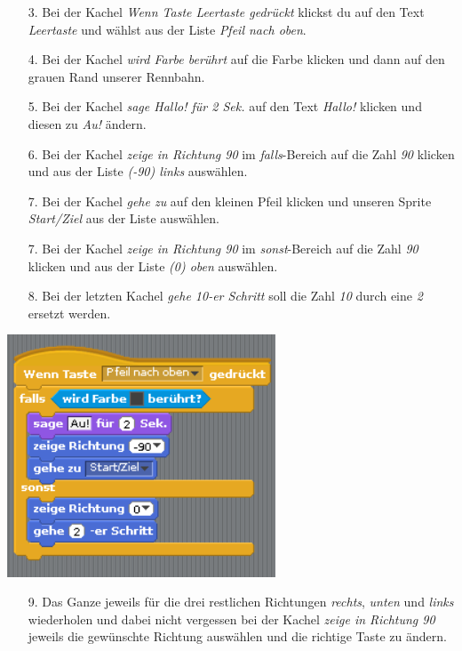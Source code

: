 \begin{itemize}
\item[3. ] Bei der Kachel \textit{Wenn Taste Leertaste gedrückt} klickst du auf den Text \textit{Leertaste} und w{\"a}hlst aus der Liste \textit{Pfeil nach oben}.
\item[4. ] Bei der Kachel \textit{wird Farbe berührt} auf die Farbe klicken und dann auf den grauen Rand unserer Rennbahn.
\item[5. ] Bei der Kachel \textit{sage Hallo! für 2 Sek.} auf den Text \textit{Hallo!} klicken und diesen zu \textit{Au!} ändern.
\item[6. ] Bei der Kachel \textit{zeige in Richtung 90} im \textit{falls}-Bereich auf die Zahl \textit{90} klicken und aus der Liste \textit{(-90) links} auswählen.
\item[7. ] Bei der Kachel \textit{gehe zu} auf den kleinen Pfeil klicken und unseren Sprite \textit{Start/Ziel} aus der Liste auswählen.
\item[7. ] Bei der Kachel \textit{zeige in Richtung 90} im \textit{sonst}-Bereich auf die Zahl \textit{90} klicken und aus der Liste \textit{(0) oben} auswählen.
\item[8. ] Bei der letzten Kachel \textit{gehe 10-er Schritt} soll die Zahl \textit{10} durch eine \textit{2} ersetzt werden.
\end{itemize}
\includegraphics[width=0.6\textwidth]{images/aufgabe4_bewege_katze_nach_oben.png}

\begin{itemize}
\item[9. ] Das Ganze jeweils für die drei restlichen Richtungen \textit{rechts}, \textit{unten} und \textit{links} wiederholen und dabei nicht vergessen bei der Kachel \textit{zeige in Richtung 90} jeweils die gewünschte Richtung auswählen und die richtige Taste zu ändern.
\end{itemize}

